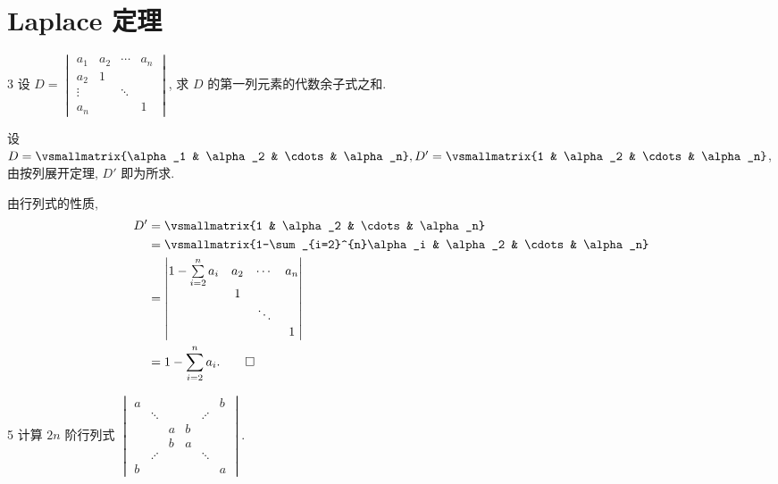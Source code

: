 
\renewcommand{\thesection}{2.3}

\section{Laplace 定理}\label{sec:2.3}

\begin{ex}{3}\label{ex:2.3.3}
    设 \(D=
    \begin{vmatrix}
        a_1 & a_2 & \cdots & a_n\\
        a_2 & 1 & &\\
        \vdots & & \ddots &\\
        a_n & & & 1
    \end{vmatrix}
    \), 求 \(D\) 的第一列元素的代数余子式之和.
\end{ex}

\begin{solution}
    设 \(D=\vsmallmatrix{\alpha_1 & \alpha_2 & \cdots & \alpha_n},D'=\vsmallmatrix{1 & \alpha_2 & \cdots & \alpha_n}\),
    由按列展开定理, \(D'\) 即为所求.

    由行列式的性质,
    \begin{align*}
        D'&=\vsmallmatrix{1 & \alpha_2 & \cdots & \alpha_n}\\
        &=\vsmallmatrix{1-\sum_{i=2}^{n}\alpha_i & \alpha_2 & \cdots & \alpha_n}\\
        &=
        \begin{vmatrix}
            1-\sum\limits_{i=2}^{n}a_i & a_2 & \cdots & a_n\\
            & 1 & &\\
            & & \ddots &\\
            & & & 1
        \end{vmatrix}\\
        &=1-\sum_{i=2}^{n}a_i.\qedhere
    \end{align*}
\end{solution}

\begin{ex}{5}\label{ex:2.3.5}
    计算 \(2n\) 阶行列式 \(
    \begin{vmatrix}
        a & & & & & b\\
        & \ddots & & & \iddots &\\
        & & a & b & &\\
        & & b & a & &\\
        & \iddots & & & \ddots &\\
        b & & & & & a
    \end{vmatrix}
    \).
\end{ex}

